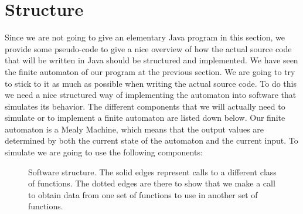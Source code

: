 \section{Structure} \label{software-design:structure}

Since we are not going to give an elementary Java program in this section, we provide some pseudo-code to give a nice overview of how the actual source code that will be written in Java should be structured and implemented. We have seen the finite automaton of our program at the previous section. We are going to try to stick to it as much as possible when writing the actual source code. To do this we need a nice structured way of implementing the automaton into software that simulates its behavior. The different components that we will actually need to simulate or to implement a finite automaton are listed down below. Our finite automaton is a Mealy Machine, which means that the output values are determined by both the current state of the automaton and the current input. To simulate we are going to use the following components:

\begin{figure}[H]
    \centering
  \caption{Software structure. The solid edges represent calls to a different class of functions. The dotted edges are there to show that we make a call to obtain data from one set of functions to use in another set of functions.}
\end{figure}

